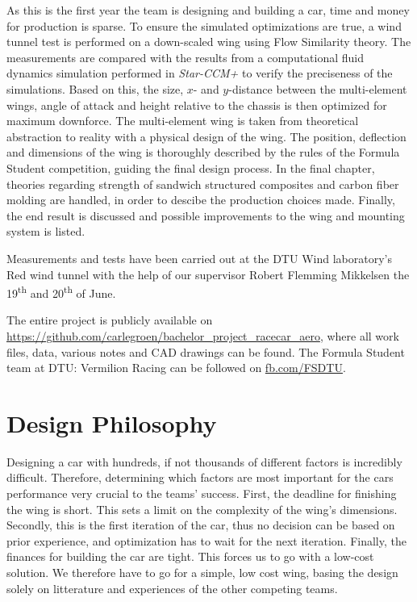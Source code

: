   As this is the first year the team is designing and building a car, time and money for production is sparse. To ensure the simulated optimizations are true, a wind tunnel test is performed on a down-scaled wing using Flow Similarity theory. The measurements are compared with the results from a computational fluid dynamics simulation performed in \emph{Star-CCM+} to verify the preciseness of the simulations. Based on this, the size, $x$- and $y$-distance between the multi-element wings, angle of attack and height relative to the chassis is then optimized for maximum downforce. The multi-element wing is taken from theoretical abstraction to reality with a physical design of the wing. The position, deflection and dimensions of the wing is thoroughly described by the rules of the Formula Student competition, guiding the final design process. In the final chapter, theories regarding strength of sandwich structured composites and carbon fiber molding are handled, in order to descibe the production choices made. Finally, the end result is discussed and possible improvements to the wing and mounting system is listed.

  Measurements and tests have been carried out at the DTU Wind laboratory's Red wind tunnel with the help of our supervisor Robert Flemming Mikkelsen the 19\textsuperscript{th} and 20\textsuperscript{th} of June.

  The entire project is publicly available on \url{https://github.com/carlegroen/bachelor_project_racecar_aero}, where all work files, data, various notes and CAD drawings can be found. The Formula Student team at DTU: Vermilion Racing can be followed on \url{fb.com/FSDTU}.

\section{Design Philosophy}
  Designing a car with hundreds, if not thousands of different factors is incredibly difficult. Therefore, determining which factors are most important for the cars performance very crucial to the teams' success. First, the deadline for finishing the wing is short. This sets a limit on the complexity of the wing's dimensions. Secondly, this is the first iteration of the car, thus no decision can be based on prior experience, and optimization has to wait for the next iteration. Finally, the finances for building the car are tight. This forces us to go with a low-cost solution. We therefore have to go for a simple, low cost wing, basing the design solely on litterature and experiences of the other competing teams.

